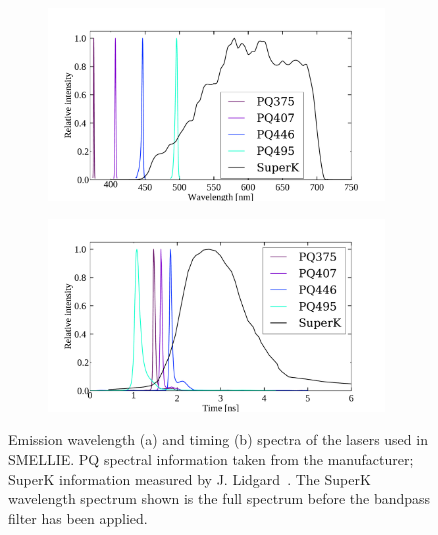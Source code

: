 \begin{figure}
    \centering
    \begin{subfigure}{0.98\textwidth}
        \centering
        \includegraphics[width=0.98\textwidth]{3_SMELLIEHardware/images/smellie_laser_wavelengths.pdf}
        \caption{}
        \label{fig:smellie_emission_wavelengths}
    \end{subfigure}
    \begin{subfigure}{0.98\textwidth}
        \centering
        \includegraphics[width=0.98\textwidth]{3_SMELLIEHardware/images/smellie_laser_timings.pdf}
        \caption{}
        \label{fig:smellie_emission_timing}
    \end{subfigure}
    \caption[Emission wavelength and timing spectra of the lasers used in SMELLIE]
    {Emission wavelength (a) and timing (b) spectra of the lasers used in SMELLIE. PQ spectral information taken from the manufacturer; SuperK information measured by J. Lidgard~\cite{lidgardSupercontinuumAdditionSMELLIE2018}. The SuperK wavelength spectrum shown is the full spectrum before the bandpass filter has been applied.}
    \label{fig:smellie_emission_wav_timing}
\end{figure}

